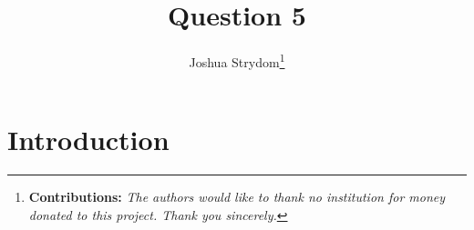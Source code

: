 \documentclass[11pt,preprint, authoryear]{elsarticle}
\numberwithin{equation}{section}
\numberwithin{figure}{section}
\numberwithin{table}{section}
\let\rmarkdownfootnote\footnote%
\def\footnote{\protect\rmarkdownfootnote}
\begin{document}
\begin{frontmatter}  %

\title{Question 5}





\author[Add1]{Joshua Strydom\footnote{\textbf{Contributions:}
  \newline \emph{The authors would like to thank no institution for
  money donated to this project. Thank you sincerely.}}}





\address[Add1]{Stellenbosch University, Stellenbosch, South Africa}



\vspace{1cm}





\vspace{0.5cm}

\end{frontmatter}



\pagestyle{fancy}
\chead{}
\rhead{}
\lfoot{}
\lhead{}
\cfoot{}


\headsep 35pt %




\hypertarget{introduction}{%
\section{\texorpdfstring{Introduction
\label{Introduction}}{Introduction }}\label{introduction}}
\end{document}
